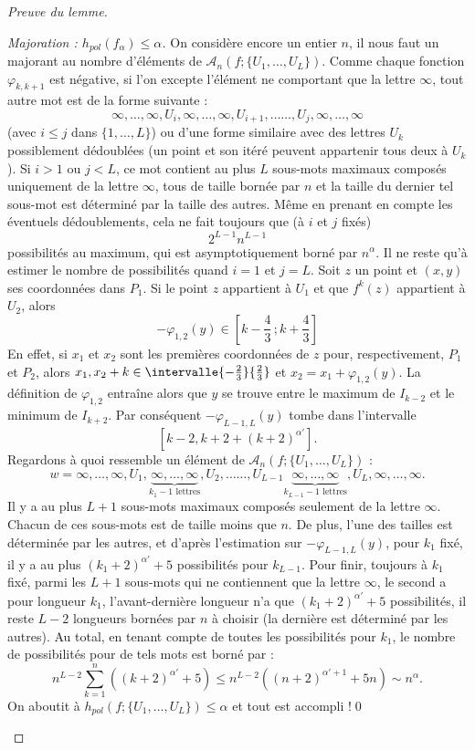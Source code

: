 \documentclass[11pt]{article}
\theoremstyle{definition}
\newenvironment{proofc}[1][\proofname]{\begin{proof}[#1]}{\end{proof}}
\numberwithin{equation}{section}
\numberwithin{figure}{section}
\numberwithin{table}{section}
\renewcommand{\proofname}{Démonstration}
\newcommand*\cA{{\mathcal A}}
\newenvironment{step}{\begin{proof}}{\let\qed\relax \end{proof}}
\begin{document}
\begin{proofc}[Preuve du lemme]
\begin{step}[Majoration : $h_{pol}(f_\alpha) \leq \alpha$]
On considère encore un entier $n$, il nous faut un majorant au nombre d'éléments de $\cA_n (f; \{U_1, \dots, U_L\})$. Comme chaque fonction $\varphi_{k,k+1}$ est négative, si l'on excepte l'élément ne comportant que la lettre $\infty$, tout autre mot est de la forme suivante :
\[
{\infty, \dots,\infty}, U_i, {\infty, \dots,\infty}, U_{i+1},
\dots \dots, U_{j}, {\infty, \dots, \infty}
\]
(avec $i \leq j$ dans $\{1, \dots, L\}$) ou d'une forme similaire avec des lettres $U_k$ possiblement dédoublées (un point et son itéré peuvent appartenir tous deux à $U_k$). Si $i>1$ ou $j <L$, {ce mot contient au plus} $L$ sous-mots {maximaux} composés uniquement de la lettre $\infty$, tous de taille bornée par $n$ et la taille du dernier tel sous-mot est déterminé par la taille des autres. Même en prenant en compte les éventuels dédoublements, cela ne fait toujours que (à $i$ et $j$ fixés)
\[
2^{L-1}n^{L-1}
\]
possibilités au maximum, qui est asymptotiquement borné par $n^\alpha$. Il ne reste qu'à estimer le nombre de possibilités quand $i=1$ et $j=L$. Soit $z$ un point et $(x,y)$ ses coordonnées dans $P_1$. Si le point $z$ appartient à $U_1$ et que $f^k(z)$ appartient à $U_2$, alors
\[
-\varphi_{1,2}(y) \in \left[k-\frac{4}{3}\,;k+\frac{4}{3}\right]
\]
En effet, si $x_1$ et $x_2$ sont les premières coordonnées de $z$ pour, respectivement, $P_1$ et $P_2$, alors $x_1, x_2+k \in \intervalle{-\frac{2}{3}}{\frac{2}{3}}$ et $x_2 = x_{1} +\varphi_{1,2}(y)$. La définition de $\varphi_{1,2}$ entraîne alors que $y$ se trouve entre le maximum de $I_{k-2}$ et le minimum de $I_{k+2}$. Par conséquent $-\varphi_{L-1,L}(y)$ tombe dans l'intervalle
\[
[k-2, k+2+(k+2)^{\alpha'}].
\]
Regardons à quoi ressemble un élément de $\cA_n (f; \{U_1, \dots, U_L\})$ :
\[
w={\infty, \dots,\infty}, U_1,
\underbrace{\infty, \dots,\infty}_{k_1-1 \text{ lettres}}, U_{2},
\dots \dots, U_{L-1}
\underbrace{\infty, \dots,\infty}_{k_{L-1}-1 \text{ lettres}}, U_{L}, {\infty, \dots, \infty}.
\]
Il y a au plus $L+1$ sous-mots {maximaux} composés seulement de la lettre $\infty$. Chacun de ces sous-mots est de taille moins que $n$. De plus, l'une des tailles est déterminée par les autres, {et d'après l'estimation sur $-\varphi_{L-1,L}(y)$,} pour $k_1$ fixé, il y a au plus $(k_1+2)^{\alpha'}+5$ possibilités pour $k_{L-1}$. Pour finir, toujours à $k_1$ fixé, {parmi les $L+1$ sous-mots qui ne contiennent que la lettre $\infty$, le second a pour longueur $k_{1}$, l'avant-dernière longueur n'a que $(k_1+2)^{\alpha'}+5$ possibilités, il reste $L-2$ longueurs bornées par $n$ à choisir (la dernière est déterminé par les autres).} Au total, {en tenant compte de toutes les possibilités pour $k_{1}$}, le nombre de possibilités pour de tels mots est borné par :
\[
n^{L-2} \sum_{k=1}^n ((k+2)^{\alpha'}+5) \leq n^{L-2} \left((n+2)^{\alpha'+1} + 5n\right) \sim n^{\alpha}.
\]
On aboutit à $h_{pol}(f; \{U_1, \dots, U_L\}) \leq \alpha$ et tout est accompli !\qed
\end{step}
\let\qed\relax
\end{proofc}
\end{document}
